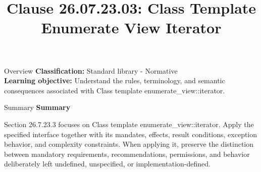 \documentclass[10pt,letterpaper]{article}
\title{Clause 26.07.23.03: Class Template Enumerate View Iterator}
\author{}
\date{}
\begin{document}
\maketitle
\begin{CornellOverviewBox}{Overview}
\textbf{Classification:} Standard library - Normative\\[2pt]
\textbf{Learning objective:} Understand the rules, terminology, and semantic consequences associated with Class template enumerate\_view::iterator.
\end{CornellOverviewBox}\begin{CornellSummaryBox}{Summary}
{\sffamily\bfseries\color{Accent} Summary}\par\vspace{3pt}Section 26.7.23.3 focuses on Class template enumerate\_view::iterator. Apply the specified interface together with its mandates, effects, result conditions, exception behavior, and complexity constraints. When applying it, preserve the distinction between mandatory requirements, recommendations, permissions, and behavior deliberately left undefined, unspecified, or implementation-defined.
\end{CornellSummaryBox}
\end{document}
